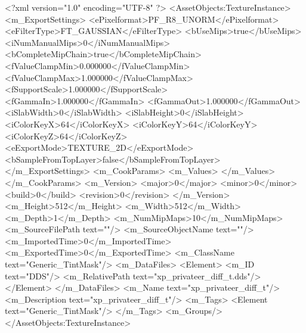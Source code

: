 <?xml version="1.0" encoding="UTF-8" ?>
<AssetObjects:TextureInstance>
<m_ExportSettings>
<ePixelformat>PF_R8_UNORM</ePixelformat>
<eFilterType>FT_GAUSSIAN</eFilterType>
<bUseMips>true</bUseMips>
<iNumManualMips>0</iNumManualMips>
<bCompleteMipChain>true</bCompleteMipChain>
<fValueClampMin>0.000000</fValueClampMin>
<fValueClampMax>1.000000</fValueClampMax>
<fSupportScale>1.000000</fSupportScale>
<fGammaIn>1.000000</fGammaIn>
<fGammaOut>1.000000</fGammaOut>
<iSlabWidth>0</iSlabWidth>
<iSlabHeight>0</iSlabHeight>
<iColorKeyX>64</iColorKeyX>
<iColorKeyY>64</iColorKeyY>
<iColorKeyZ>64</iColorKeyZ>
<eExportMode>TEXTURE_2D</eExportMode>
<bSampleFromTopLayer>false</bSampleFromTopLayer>
</m_ExportSettings>
<m_CookParams>
<m_Values>
</m_Values>
</m_CookParams>
<m_Version>
<major>0</major>
<minor>0</minor>
<build>0</build>
<revision>0</revision>
</m_Version>
<m_Height>512</m_Height>
<m_Width>512</m_Width>
<m_Depth>1</m_Depth>
<m_NumMipMaps>10</m_NumMipMaps>
<m_SourceFilePath text=""/>
<m_SourceObjectName text=""/>
<m_ImportedTime>0</m_ImportedTime>
<m_ExportedTime>0</m_ExportedTime>
<m_ClassName text="Generic_TintMask"/>
<m_DataFiles>
<Element>
<m_ID text="DDS"/>
<m_RelativePath text="xp_privateer_diff_t.dds"/>
</Element>
</m_DataFiles>
<m_Name text="xp_privateer_diff_t"/>
<m_Description text="xp_privateer_diff_t"/>
<m_Tags>
<Element text="Generic_TintMask"/>
</m_Tags>
<m_Groups/>
</AssetObjects:TextureInstance>
